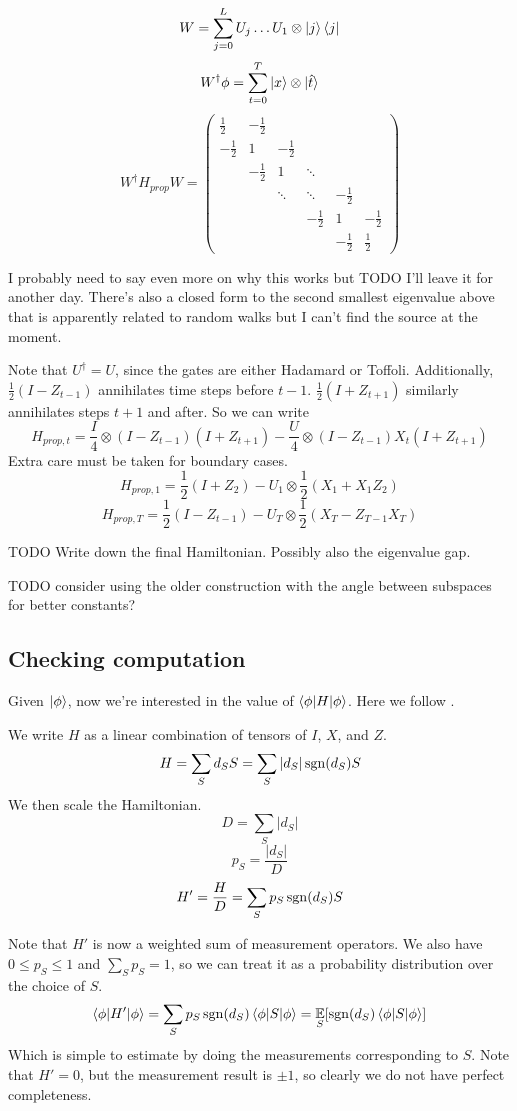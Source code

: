 $$W=\sum_{j=0}^L U_j\ldots U_1\otimes\ket{j}\bra{j}$$
$$W^\dagger\phi=\sum_{t=0}^T\ket{x}\otimes\ket{\hat{t}}$$
$$W^\dagger H_{prop} W=
\begin{pmatrix}
	\frac{1}{2} & -\frac{1}{2} & & & &  \\
	-\frac{1}{2} & 1 & -\frac{1}{2} & & & \\
	& -\frac{1}{2} & 1 & \ddots & & \\
	& & \ddots & \ddots & -\frac{1}{2} & \\
	& & & -\frac{1}{2} & 1 & -\frac{1}{2} \\
	& & & & -\frac{1}{2} & \frac{1}{2}
\end{pmatrix}$$

I probably need to say even more on why this works but TODO I'll leave it for another day. There's also a closed form to the second smallest eigenvalue above that is apparently related to random walks but I can't find the source at the moment.

Note that $U^\dagger=U$, since the gates are either Hadamard or Toffoli. Additionally, $\frac{1}{2}(I-Z_{t-1})$ annihilates time steps before $t-1$. $\frac{1}{2}(I+Z_{t+1})$ similarly annihilates steps $t+1$ and after.
So we can write
$$H_{prop,t}=\frac{I}{4}\otimes(I-Z_{t-1})(I+Z_{t+1})-\frac{U}{4}\otimes(I-Z_{t-1})X_t(I+Z_{t+1})$$
Extra care must be taken for boundary cases.
$$H_{prop,1}=\frac{1}{2}(I+Z_2)-U_1\otimes\frac{1}{2}(X_1+X_1Z_2)$$
$$H_{prop,T}=\frac{1}{2}(I-Z_{t-1})-U_T\otimes\frac{1}{2}(X_T-Z_{T-1}X_T)$$

TODO Write down the final Hamiltonian. Possibly also the eigenvalue gap.

TODO consider using the older construction with the angle between subspaces for better constants?

\subsection{Checking computation}

Given $\ket\phi$, now we're interested in the value of $\braket{\phi|H|\phi}$. Here we follow \cite{PhysRevA.93.022326}.

We write $H$ as a linear combination of tensors of $I$, $X$, and $Z$.
$$H=\sum_S d_S S= \sum_S |d_S|\operatorname{sgn}(d_S)S$$
We then scale the Hamiltonian.
$$D=\sum_S|d_S|$$
$$p_S=\frac{|d_S|}{D}$$
$$H'=\frac{H}{D}=\sum_S p_S\operatorname{sgn}(d_S)S$$

Note that $H'$ is now a weighted sum of measurement operators. We also have $0\leq p_S\leq1$ and $\sum_S p_S=1$, so we can treat it as a probability distribution over the choice of $S$.
$$\braket{\phi|H'|\phi}=\sum_S p_S\operatorname{sgn}(d_S)\braket{\phi|S|\phi}=\operatorname*{\mathbb{E}}_S[\operatorname{sgn}(d_S)\braket{\phi|S|\phi}]$$
Which is simple to estimate by doing the measurements corresponding to $S$.
Note that $H'=0$, but the measurement result is $\pm1$, so clearly we do not have perfect completeness.

